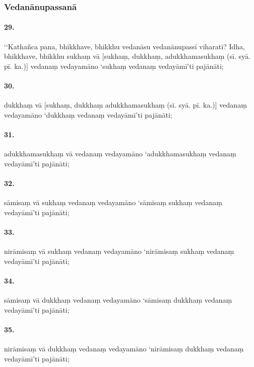 

\subsubsection{Vedanānupassanā}

\paragraph{29.} ‘‘Kathañca pana, bhikkhave, bhikkhu vedanāsu vedanānupassī viharati? Idha, bhikkhave, bhikkhu sukhaṃ vā [sukhaṃ, dukkhaṃ, adukkhamasukhaṃ (sī. syā. pī. ka.)] vedanaṃ vedayamāno ‘sukhaṃ vedanaṃ vedayāmī’ti pajānāti;

\paragraph{30.} dukkhaṃ vā [sukhaṃ, dukkhaṃ adukkhamasukhaṃ (sī. syā. pī. ka.)] vedanaṃ vedayamāno ‘dukkhaṃ vedanaṃ vedayāmī’ti pajānāti;

\paragraph{31.} adukkhamasukhaṃ vā vedanaṃ vedayamāno ‘adukkhamasukhaṃ vedanaṃ vedayāmī’ti pajānāti;

\paragraph{32.} sāmisaṃ vā sukhaṃ vedanaṃ vedayamāno ‘sāmisaṃ sukhaṃ vedanaṃ vedayāmī’ti pajānāti;

\paragraph{33.} nirāmisaṃ vā sukhaṃ vedanaṃ vedayamāno ‘nirāmisaṃ sukhaṃ vedanaṃ vedayāmī’ti pajānāti;

\paragraph{34.} sāmisaṃ vā dukkhaṃ vedanaṃ vedayamāno ‘sāmisaṃ dukkhaṃ vedanaṃ vedayāmī’ti pajānāti;

\paragraph{35.} nirāmisaṃ vā dukkhaṃ vedanaṃ vedayamāno ‘nirāmisaṃ dukkhaṃ vedanaṃ vedayāmī’ti pajānāti;

